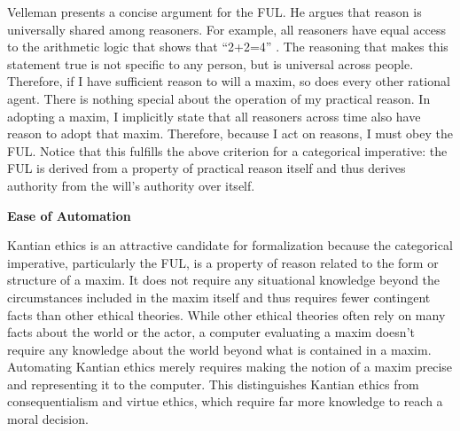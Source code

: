 \begin{isabellebody}
\begin{isamarkuptext}
Velleman presents a concise argument for the FUL. He argues that reason is universally shared among reasoners. For 
example, all reasoners have equal access to the arithmetic logic that shows that ``2+2=4'' \cite[29]{velleman}. The 
reasoning that makes this statement true is not specific to any person, but is universal across 
people. Therefore, if I have sufficient reason to will a maxim, so does every other rational agent. There 
is nothing special about the operation of my practical reason. In adopting a maxim, I implicitly state 
that all reasoners across time also have reason to adopt that maxim. Therefore, because I act on 
reasons, I must obey the FUL. Notice that this fulfills the above criterion for a categorical 
imperative: the FUL is derived from a property of practical reason itself and thus derives authority 
from the will's authority over itself.%
\end{isamarkuptext}\isamarkuptrue%
%
\begin{isamarkuptext}%
\noindent \textbf{Ease of Automation}%
\end{isamarkuptext}\isamarkuptrue%
%
\begin{isamarkuptext}%
Kantian ethics is an attractive candidate for formalization because the categorical imperative, particularly the FUL, 
is a property of reason related to the form or structure of a maxim. It does not require any situational 
knowledge beyond the circumstances included
in the maxim itself and thus requires fewer contingent facts than other ethical theories.
While other ethical theories often rely on many facts about 
the world or the actor, a computer evaluating 
a maxim doesn't require any knowledge about the world beyond what is contained in a maxim. Automating 
Kantian ethics merely requires making the notion of a maxim precise and representing it to the computer. 
This distinguishes Kantian ethics from consequentialism and virtue ethics, which
require far more knowledge to reach a moral decision.


\end{isamarkuptext}
\end{isabellebody}

